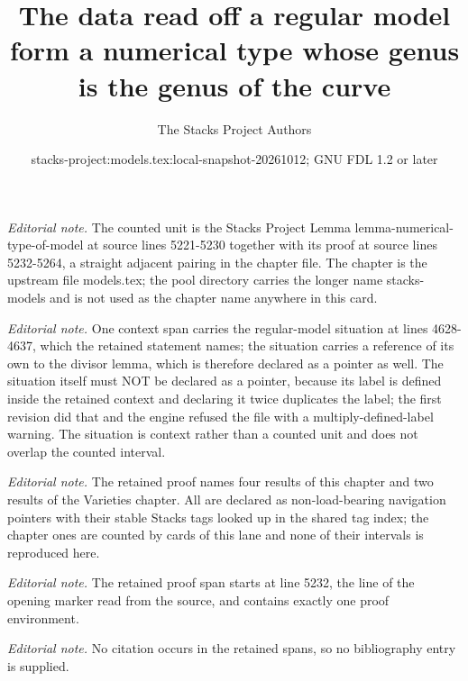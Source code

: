 \documentclass[10pt,a4paper]{amsart}
\title{The data read off a regular model form a numerical type whose genus is the genus of the curve}
\author{The Stacks Project Authors}
\date{stacks-project:models.tex:local-snapshot-20261012; GNU FDL 1.2 or later}
\theoremstyle{plain}
\theoremstyle{definition}
\theoremstyle{remark}
\numberwithin{equation}{subsection}
\begin{document}
\maketitle
\noindent\textit{Editorial note.} The counted unit is the Stacks Project Lemma lemma-numerical-type-of-model at source lines 5221-5230 together with its proof at source lines 5232-5264, a straight adjacent pairing in the chapter file. The chapter is the upstream file models.tex; the pool directory carries the longer name stacks-models and is not used as the chapter name anywhere in this card.\par\medskip
\noindent\textit{Editorial note.} One context span carries the regular-model situation at lines 4628-4637, which the retained statement names; the situation carries a reference of its own to the divisor lemma, which is therefore declared as a pointer as well. The situation itself must NOT be declared as a pointer, because its label is defined inside the retained context and declaring it twice duplicates the label; the first revision did that and the engine refused the file with a multiply-defined-label warning. The situation is context rather than a counted unit and does not overlap the counted interval.\par\medskip
\noindent\textit{Editorial note.} The retained proof names four results of this chapter and two results of the Varieties chapter. All are declared as non-load-bearing navigation pointers with their stable Stacks tags looked up in the shared tag index; the chapter ones are counted by cards of this lane and none of their intervals is reproduced here.\par\medskip
\noindent\textit{Editorial note.} The retained proof span starts at line 5232, the line of the opening marker read from the source, and contains exactly one proof environment.\par\medskip
\noindent\textit{Editorial note.} No citation occurs in the retained spans, so no bibliography entry is supplied.\par\medskip
\end{document}
